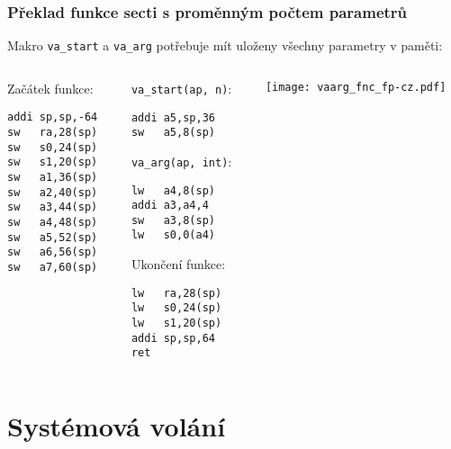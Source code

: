\documentclass{beamer}
\begin{document}
\begin{frame}[fragile,shrink=5]
\frametitle{Překlad funkce secti s proměnným počtem parametrů}

Makro \texttt{va\_start} a \texttt{va\_arg} potřebuje mít uloženy všechny parametry v paměti:

\begin{columns}
\begin{column}{0.25\textwidth}
Začátek funkce:

\begin{verbatim}
addi sp,sp,-64
sw   ra,28(sp)
sw   s0,24(sp)
sw   s1,20(sp)
sw   a1,36(sp)
sw   a2,40(sp)
sw   a3,44(sp)
sw   a4,48(sp)
sw   a5,52(sp)
sw   a6,56(sp)
sw   a7,60(sp)
\end{verbatim}
\end{column}   
\begin{column}{0.4\textwidth}
\texttt{va\_start(ap, n)}:

\begin{verbatim}
addi a5,sp,36
sw   a5,8(sp)
\end{verbatim}
\texttt{va\_arg(ap, int)}:
\begin{verbatim}
lw   a4,8(sp)
addi a3,a4,4
sw   a3,8(sp)
lw   s0,0(a4)
\end{verbatim}

Ukončení funkce:

\begin{verbatim}
lw   ra,28(sp)
lw   s0,24(sp)
lw   s1,20(sp)
addi sp,sp,64
ret
\end{verbatim}
\end{column}
\begin{column}{0.3\textwidth}  
\texttt{[image: vaarg\_fnc\_fp-cz.pdf]}
\end{column}
\end{columns}
\end{frame}


\section {Systémová volání}
\end{document}
